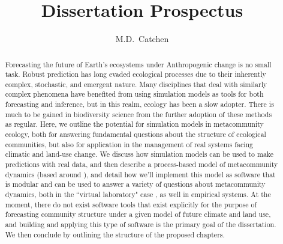 \documentclass[]{article}
\title{Dissertation Prospectus}
\author{M.D.~Catchen}
\date{}
\begin{document}
\maketitle
\begin{abstract}
Forecasting the future of Earth's ecosystems under Anthropogenic change is no small task.
Robust prediction has long evaded ecological processes due to their inherently complex, stochastic, and emergent nature.
Many disciplines that deal with similarly complex phenomena have benefited from using simulation models as tools for both forecasting and inference, but in this realm, ecology has been a slow adopter.
There is much to be gained in biodiversity science from the further adoption of these methods as regular.
Here, we outline the potential for simulation models in metacommunity ecology, both for answering fundamental questions about the structure of ecological communities, but also for application in the management of real systems facing climatic and land-use change.
We discuss how simulation models can be used to make predictions with real data, and then
describe a process-based model of metacommunity dynamics (based around \citep{vellend_conceptual_2010, poisot_beyond_2015, thompson_process-based_2020}), and detail how we'll implement this model as software that is modular and can be used to answer a variety of questions about metacommunity dynamics, both in the ``virtual laboratory" case \citep{railsback_agent-based_2011}, as well in empirical systems.
At the moment, there do not exist software tools that exist explicitly for the purpose of forecasting community structure under a given model of future climate and land use, and building and applying this type of software is the primary goal of the dissertation.
We then conclude by outlining the structure of the proposed chapters.
\end{abstract}

\pagebreak
\end{document}
